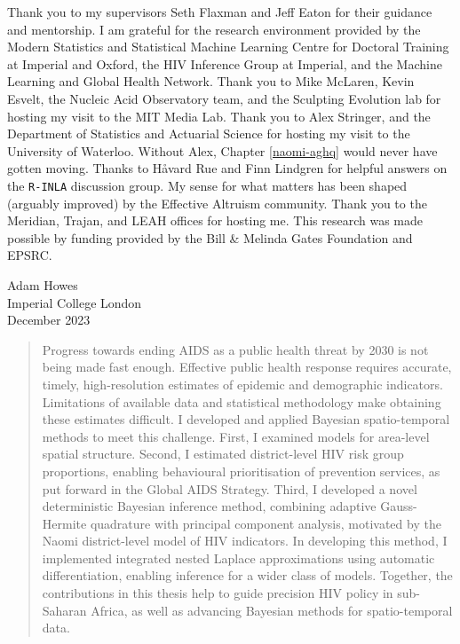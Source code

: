\documentclass[a4paper, nobind]{templates/ociamthesis}
\begin{document}
\begin{romanpages}
\begin{acknowledgements}
 	Thank you to my supervisors Seth Flaxman and Jeff Eaton for their guidance and mentorship.
 I am grateful for the research environment provided by the Modern Statistics and Statistical Machine Learning Centre for Doctoral Training at Imperial and Oxford, the HIV Inference Group at Imperial, and the Machine Learning and Global Health Network.
 Thank you to Mike McLaren, Kevin Esvelt, the Nucleic Acid Observatory team, and the Sculpting Evolution lab for hosting my visit to the MIT Media Lab.
 Thank you to Alex Stringer, and the Department of Statistics and Actuarial Science for hosting my visit to the University of Waterloo.
 Without Alex, Chapter \ref{naomi-aghq} would never have gotten moving.
 Thanks to Håvard Rue and Finn Lindgren for helpful answers on the \texttt{R-INLA} discussion group.
 My sense for what matters has been shaped (arguably improved) by the Effective Altruism community.
 Thank you to the Meridian, Trajan, and LEAH offices for hosting me.
 This research was made possible by funding provided by the Bill \& Melinda Gates Foundation and EPSRC.

 \begin{flushright}
 Adam Howes \\
 Imperial College London\\
 December 2023
 \end{flushright}
\end{acknowledgements}

\begin{abstract}
	Progress towards ending AIDS as a public health threat by 2030 is not being made fast enough.
Effective public health response requires accurate, timely, high-resolution estimates of epidemic and demographic indicators.
Limitations of available data and statistical methodology make obtaining these estimates difficult.
I developed and applied Bayesian spatio-temporal methods to meet this challenge.
First, I examined models for area-level spatial structure.
Second, I estimated district-level HIV risk group proportions, enabling behavioural prioritisation of prevention services, as put forward in the Global AIDS Strategy.
Third, I developed a novel deterministic Bayesian inference method, combining adaptive Gauss-Hermite quadrature with principal component analysis, motivated by the Naomi district-level model of HIV indicators.
In developing this method, I implemented integrated nested Laplace approximations using automatic differentiation, enabling inference for a wider class of models.
Together, the contributions in this thesis help to guide precision HIV policy in sub-Saharan Africa, as well as advancing Bayesian methods for spatio-temporal data.
\end{abstract}


\end{romanpages}
\end{document}
